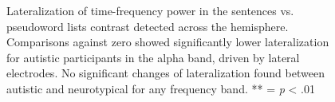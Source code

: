 \begin{figure}[!ht]
	\centering
	\caption{Lateralization of time-frequency power in the sentences vs. pseudoword lists contrast detected across the hemisphere. Comparisons against zero showed significantly lower lateralization for autistic participants in the alpha band, driven by lateral electrodes. No significant changes of lateralization found between autistic and neurotypical for any frequency band. ** = \textit{p} < .01}
    \vspace*{5pt}
	\label{fig:laterality-topo}
\end{figure}



